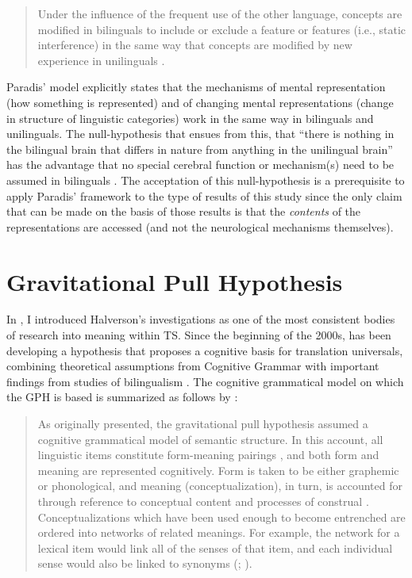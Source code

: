 \begin{quote}
Under the influence of the frequent use of the other language, concepts are modified in bilinguals to include or exclude a feature or features (i.e., static interference) in the same way that concepts are modified by new experience in unilinguals \citep[11]{kecskes_neurofunctional_2007}.
\end{quote}

Paradis’ model explicitly states that the mechanisms of mental representation (how something is represented) and of changing mental representations (change in structure of linguistic categories) work in the same way in bilinguals and unilinguals. The null-hypothesis that ensues from this, that “there is nothing in the bilingual brain that differs in nature from anything in the unilingual brain” \citep[189]{paradis_neurolinguistic_2004} has the advantage that no special cerebral function or mechanism(s) need to be assumed in bilinguals \citep[26]{kecskes_neurofunctional_2007}. The acceptation of this null-hypothesis is a prerequisite to apply Paradis’ framework to the type of results of this study since the only claim that can be made on the basis of those results is that the \textit{contents} of the representations are accessed (and not the neurological mechanisms themselves).

\section{Gravitational Pull Hypothesis}
\label{sec:5.2}  
In , I introduced Halverson’s investigations as one of the most consistent bodies of research into meaning within TS. Since the beginning of the 2000s, \citet{halverson_cognitive_2003,shreve_cognitive_2010,rojo_implications_2013,de_sutter_developing_2017} has been developing a hypothesis that proposes a cognitive basis for translation universals, combining theoretical assumptions from Cognitive Grammar with important findings from studies of bilingualism \citep{heredia_bilingual_2014,jarvis_crosslinguistic_2008,kroll_category_1994}. The cognitive grammatical model on which the GPH is based is summarized as follows by \citet[12]{de_sutter_developing_2017}:

\begin{quote}
As originally presented, the gravitational pull hypothesis assumed a cognitive grammatical model of semantic structure. In this account, all linguistic items constitute form-meaning pairings \citep[76]{langacker_foundations_1987}, and both form and meaning are represented cognitively. Form is taken to be either graphemic or phonological, and meaning (conceptualization), in turn, is accounted for through reference to conceptual content and processes of construal \citep[99--146]{langacker_foundations_1987}. Conceptualizations which have been used enough to become entrenched are ordered into networks of related meanings. For example, the network for a lexical item would link all of the senses of that item, and each individual sense would also be linked to synonyms (\citealt[385]{langacker_foundations_1987}; \citealt[27--54]{langacker_cognitive_2008}).
\end{quote}

